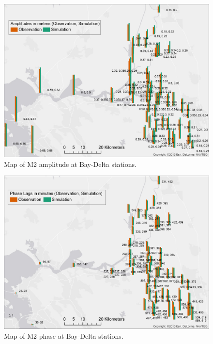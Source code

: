 \begin{figure}
	\centering
		\includegraphics[width=\textwidth]{image/M2_amp_spatial}
	\caption{Map of M2 amplitude at Bay-Delta stations.}
	\label{fig:m2_amp}
\end{figure}
\begin{figure}
	\centering
		\includegraphics[width=\textwidth]{image/M2_phase_min_spatial}
	\caption{Map of M2 phase at Bay-Delta stations.}
	\label{fig:m2_phase}
\end{figure}
